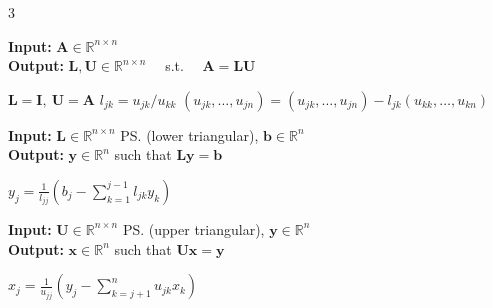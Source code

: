 \documentclass{note}
\begin{document}
\begin{multicols}{3}

\begin{algorithm}[H]
\tiny
\caption*{\textbf{LU} LU factorisation \vspace{-0.1cm} \\ \ps{$C(n) = \sum^{n-1}_{k=1}(n-k)(1+2(n-k+1)) = \frac{2}{3}n^3+\frac{1}{2}n^2-\frac{7}{6}n$}}
\textbf{Input:} $\mathbf{A} \in \mathbb{R}^{n \times n}$ \\
\textbf{Output:} $\mathbf{L}, \mathbf{U} \in \mathbb{R}^{n \times n}$ \ \ s.t. \ \ $\mathbf{A} = \mathbf{LU}$
\begin{algorithmic}[1]
  \State $\mathbf{L} = \mathbf{I},\ \mathbf{U} = \mathbf{A}$
      \State $l_{jk} = u_{jk} / u_{kk}$
      \State $(u_{jk}, \dots, u_{jn}) = (u_{jk}, \dots, u_{jn}) - l_{jk}(u_{kk}, \dots, u_{kn})$
    \EndFor
  \EndFor
\end{algorithmic}
\end{algorithm}

\begin{algorithm}[H]
\tiny
\caption*{\textbf{FS} Forward substitution \vspace{-0.1cm} \\ \ps{$C(n) = \sum_{j=1}^{n}[2(j-1)+1]=n^2=\Ocal(n^2)$}}
\textbf{Input:} $\mathbf{L} \in \mathbb{R}^{n \times n}$ \ps{(lower triangular)}, $\mathbf{b} \in \mathbb{R}^n$ \\
\textbf{Output:} $\mathbf{y} \in \mathbb{R}^n$ such that $\mathbf{Ly} = \mathbf{b}$
\begin{algorithmic}[1]
    \State $y_j = \frac{1}{l_{jj}} \left( b_j - \sum_{k = 1}^{j - 1} l_{jk} y_k \right)$
  \EndFor
\end{algorithmic}
\end{algorithm}

\begin{algorithm}[H]
\tiny
\caption*{\textbf{BS} Back substitution \vspace{-0.1cm} \\ \ps{$C(n) = \sum_{j=1}^n[2(n-j)+1]=n^2=\Ocal(n^2)$}}
\textbf{Input:} $\mathbf{U} \in \mathbb{R}^{n \times n}$ \ps{(upper triangular)}, $\mathbf{y} \in \mathbb{R}^n$ \\
\textbf{Output:} $\mathbf{x} \in \mathbb{R}^n$ such that $\mathbf{Ux} = \mathbf{y}$
\begin{algorithmic}[1]
    \State $x_j = \frac{1}{u_{jj}} \left( y_j - \sum_{k = j + 1}^{n} u_{jk} x_k \right)$
  \EndFor
\end{algorithmic}
\end{algorithm}

\end{multicols}
\end{document}
